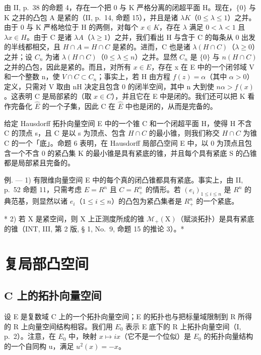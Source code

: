 由 II, p.~38 的命题 4，存在一个把 0 与 K 严格分离的闭超平面 H。现在，\(\{0\}\) 与 K 之并的凸包 A 是紧的（II, p.~14, 命题 15），并且是诸 \(\lambda K\)（\(0 \leqslant \lambda \leqslant 1\)）之并。由于 0 与 K 严格地位于 H 的两侧，对每个 \(x \in K\)，存在 \(\lambda\) 满足 \(0 < \lambda < 1\) 且 \(\lambda x \in H\)。由于 C 是诸 \(\lambda A\)（\(\lambda \geqslant 1\)）之并，我们看出 H 与含于 C 的每条从 0 出发的半线都相交，且 \(H \cap A = H \cap C\) 是紧的。进而，C 也是诸 \(\lambda(H \cap C)\)（\(\lambda \geqslant 0\)）之并；设 \(C_n\) 为诸 \(\lambda(H \cap C)\)（\(0 \leqslant \lambda \leqslant n\)）之并。显然 \(C_n\) 是 \(\{0\}\) 与 \(n(H \cap C)\) 之并的凸包，因此是紧的。而且，对所有 \(x \in E\)，存在 x 在 E 中的一个闭邻域 V 和一个整数 n，使 \(V \cap C \subset C_n\)；事实上，若 H 由方程 \(f(z) = \alpha\)（其中 \(\alpha > 0\)）定义，只需对 V 取由 nH 决定且包含 0 的闭半空间，其中 n 大到使 \(n\alpha > f(x)\)。这表明 C 是局部紧的（取 \(x \in C\)），并且它在 E 中是闭的。我们还可以把 K 看作完备化 \(\hat{E}\) 的一个子集，因此 C 在 \(\hat{E}\) 中也是闭的，从而是完备的。

给定 Hausdorff 拓扑向量空间 E 中的一个锥 C 和一个闭超平面 H，使得 H 不含 C 的顶点 s，且 C 是以 s 为顶点、包含 \(H \cap C\) 的最小锥，则我们称交 \(H \cap C\) 为锥 C 的一个「底」。命题 6 表明，在 Hausdorff 局部凸空间 E 中，以 0 为顶点且包含一个不含 0 的紧凸集 K 的最小锥是具有紧底的锥，并且每个具有紧底 S 的凸锥都是局部紧且完备的。

例. --- 1) 有限维向量空间 E 中的每个真的闭凸锥都具有紧底。事实上，由 II, p.~52 命题 11，只需考虑 \(E = R^{n}\) 且 \(C = R_{+}^{n}\) 的情形。若 \((e_{i})_{1 \leqslant i \leqslant n}\) 是 \(R^{n}\) 的典范基，则显然以诸 \(e_{i}\)（\(1 \leqslant i \leqslant n\)）的凸包为紧凸集者是 \(R_{+}^{n}\) 的一个紧底。

* 2) 若 X 是紧空间，则 X 上正测度所成的锥 \(\mathcal{M}_{+}(\mathrm{X})\)（赋淡拓扑）是具有紧底的锥（INT, III, 第 2 版, § 1, No.~9, 命题 15 的推论 3）。*

\section{复局部凸空间}

\subsection{\texorpdfstring{\(\mathbf{C}\) 上的拓扑向量空间}{复数域上的拓扑向量空间}}

设 E 是复数域 C 上的一个拓扑向量空间；E 的拓扑也与把标量域限制到 R 所得的 R 上向量空间结构相容。我们用 \(E_{0}\) 表示 E 底下的 R 上拓扑向量空间（I, p.~2）。注意，在 \(E_{0}\) 中，映射 \(x \mapsto ix\)（它不是一个位似）是 \(E_{0}\) 的拓扑向量结构的一个自同构 u，满足 \(u^{2}(x) = -x\)。

